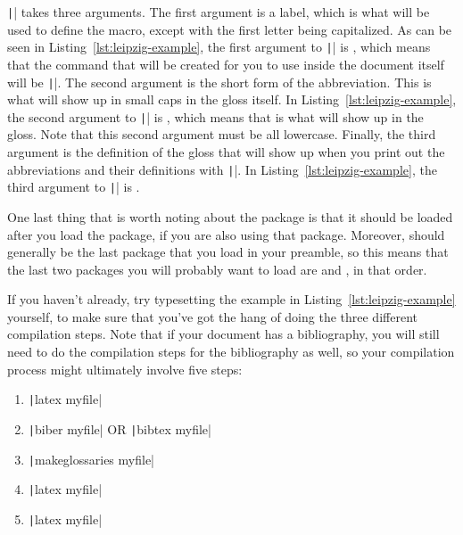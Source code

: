 \texttt|\newleipzig| takes three arguments.
The first argument is a label, which is what will be used to define the macro, except with the first letter being capitalized.
As can be seen in Listing~\ref{lst:leipzig-example}, the first argument to \texttt|\newleipzig| is , which means that the command that will be created for you to use inside the document itself will be \texttt|\Pol{}|.
The second argument is the short form of the abbreviation.
This is what will show up in small caps in the gloss itself.
In Listing~\ref{lst:leipzig-example}, the second argument to \texttt|\newleipzig| is , which means that \Pol{} is what will show up in the gloss.
Note that this second argument must be all lowercase.
Finally, the third argument is the definition of the gloss that will show up when you print out the abbreviations and their definitions with \texttt|\printglosses|.
In Listing~\ref{lst:leipzig-example}, the third argument to \texttt|\newleipzig| is .

One last thing that is worth noting about the  package is that it should be loaded after you load the  package, if you are also using that package.
Moreover,  should generally be the last package that you load in your preamble, so this means that the last two packages you will probably want to load are  and , in that order.

If you haven't already, try typesetting the example in Listing~\ref{lst:leipzig-example} yourself, to make sure that you've got the hang of doing the three different compilation steps.
Note that if your document has a bibliography, you will still need to do the compilation steps for the bibliography as well, so your compilation process might ultimately involve five steps:

\begin{enumerate}[label={(\roman*)}]

	\item{\texttt|latex myfile|}

	\item{\texttt|biber myfile| OR \texttt|bibtex myfile|}

	\item{\texttt|makeglossaries myfile|}

	\item{\texttt|latex myfile|}

	\item{\texttt|latex myfile|}

\end{enumerate}

